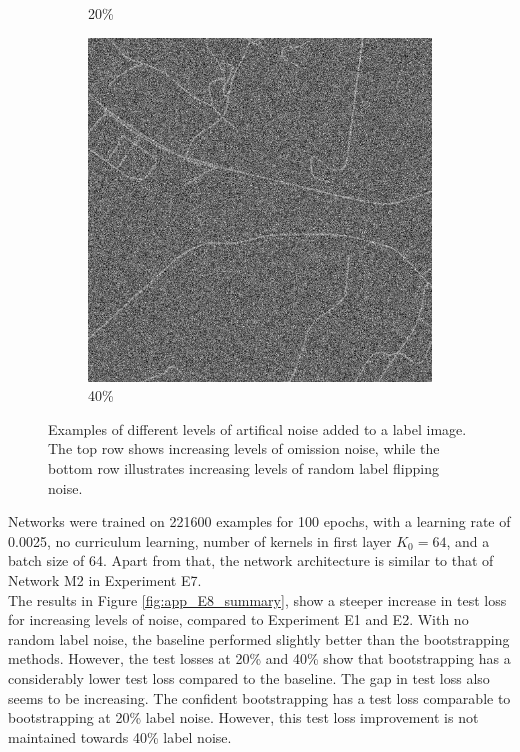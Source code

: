\begin{figure}[!b]
\begin{subfigure}{0.31\textwidth}
\caption{20\%}
\end{subfigure}
\hspace*{\fill} %
\begin{subfigure}{0.31\textwidth}
\includegraphics[width=\linewidth]{figs/E8/flipping/noise4.png}
\caption{40\%}
\end{subfigure}
\caption[Artifical noise examples]{Examples of different levels of artifical noise added to a label image. The top row shows increasing levels of omission noise, while the bottom row illustrates increasing levels of random label flipping noise. } \label{fig:app_E8_noise_flipping}
\end{figure}

Networks were trained on 221600 examples for 100 epochs, with a learning rate of 0.0025, no curriculum learning, number of kernels in first layer $K_0=64$, and a batch size of 64. Apart from that, the network architecture is similar to that of Network M2 in Experiment E7.\\

The results in Figure \ref{fig:app_E8_summary}, show a steeper increase in test loss for increasing levels of noise, compared to Experiment E1 and E2. With no random label noise, the baseline performed slightly better than the bootstrapping methods. However, the test losses at 20\% and 40\% show that bootstrapping has a considerably lower test loss compared to the baseline. The gap in test loss also seems to be increasing. The confident bootstrapping has a test loss comparable to bootstrapping at 20\% label noise. However, this test loss improvement is not maintained towards 40\% label noise. \\


